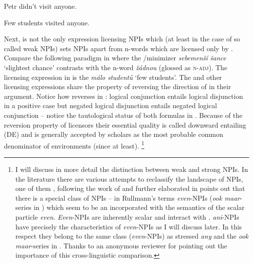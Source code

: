 \documentclass[output=paper, colorlinks, citecolor=brown, newtxmath]{langsci/langscibook}
\begin{document}
\label{ex-8}
\z

\ea \label{ex-9} Petr didn't visit anyone.
\z
\z

\ea Few students visited anyone.\label{ex-9-5}
\z

\noindent Next,  is not the only expression licensing NPIs which (at least in the case of so called weak NPIs) sets NPIs apart from n-words which are licensed only by . Compare the following  paradigm in  where the /minimizer \textit{sebemenší šance} `slightest chance' contrasts with the  n-word \textit{žádnou} (glossed as \textsc{n-adj}). The  licensing expression in  is the  \textit{málo studentů} `few students'. The  and other   licensing expressions share the property of reversing the direction of  in their argument. Notice how  reverses  in : logical conjunction entails logical disjunction in a positive case but negated logical disjunction entails negated logical conjunction -- notice the tautological status of both formulas in . Because of the  reversion property of  licensors their essential quality is called downward entailing (DE) and is generally accepted by scholars as the most probable common denominator of  environments (since \citealt{ladusaw1992expressing} at least).%
\footnote{I will discuss in more detail the distinction between weak and strong NPIs. In the literature there are various attempts to reclassify the landscape of NPIs, one of them \citealt{rullmann1996two}, following the work of \citealt{krifka1995semantics} and further elaborated in \citealt{lahiri1998focus} points out that there is a special class of NPIs -- in Rullmann's terms \textit{even}-NPIs (\textit{ook maar}-series in ) which seem to be an  incorporated with the semantics of the scalar  particle \textit{even}. \textit{Even}-NPIs are inherently scalar and interact with .  \textit{ani}-NPIs have precisely the characteristics of \textit{even}-NPIs as I will discuss later. In this respect they belong to the same class (\textit{even}-NPIs) as stressed  \textit{any} and the \textit{ook maar}-series in . Thanks to an anonymous reviewer for pointing out the importance of this cross-linguistic comparison.}
\end{document}
